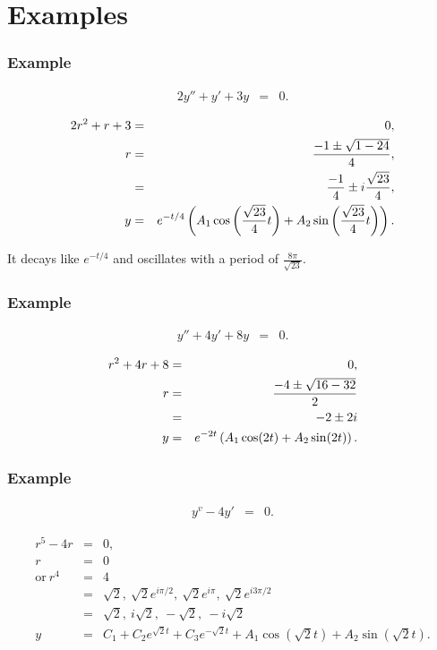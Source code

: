 \section{Examples}

\begin{frame}
  \frametitle{Example}

  \begin{eqnarray*}
    2y'' + y' + 3y & = & 0.
  \end{eqnarray*}
  
  {
    \begin{eqnarray*}
      2r^2+r+3 & = & 0, \\
      r & = & \frac{-1\pm\sqrt{1-24}}{4}, \\
      & = & \frac{-1}{4} \pm i\frac{\sqrt{23}}{4}, \\
      y & = & e^{-t/4} 
      \left( A_1 \cos\left( \frac{\sqrt{23}}{4} t \right) + A_2 \sin\left( \frac{\sqrt{23}}{4} t \right) \right).
    \end{eqnarray*}

    It decays like $e^{-t/4}$ and oscillates with a period of $\frac{8\pi}{\sqrt{23}}$.
  }

\end{frame}


\begin{frame}
  \frametitle{Example}

  \begin{eqnarray*}
    y'' + 4 y' + 8y & = & 0.
  \end{eqnarray*}

  {
    \begin{eqnarray*}
      r^2 + 4r + 8 & = & 0, \\
      r & = & \frac{-4\pm\sqrt{16-32}}{2} \\
      & = & -2 \pm 2i \\
      y & = & e^{-2t} \left( A_1 \cos(2t) + A_2 \sin(2t) \right).
    \end{eqnarray*}
  }

\end{frame}


\begin{frame}
  \frametitle{Example}

  \begin{eqnarray*}
    y^v - 4 y'& = & 0.
  \end{eqnarray*}

  {
    \begin{eqnarray*}
      r^5 - 4r & = & 0, \\
      r & = & 0 \\
      \mathrm{or~} r^4 & = & 4 \\
      & = & \sqrt{2},~\sqrt{2}e^{i \pi/2}, ~ \sqrt{2}e^{i \pi},~ \sqrt{2}e^{i 3\pi/2} \\
      & = & \sqrt{2},~i\sqrt{2},~-\sqrt{2},~-i\sqrt{2} \\
      y & = & C_1 + C_2 e^{\sqrt{2}t} + C_3 e^{-\sqrt{2}t} + 
      A_1 \cos(\sqrt{2}t) + A_2 \sin(\sqrt{2}t).
    \end{eqnarray*}
  }


\end{frame}


